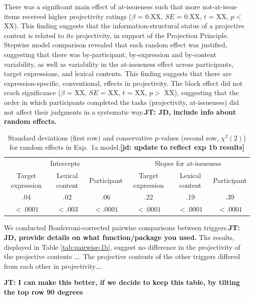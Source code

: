 \documentclass[11pt,fleqn]{article}
\newcommand{\6}{\mbox{$[\hspace*{-.6mm}[$}}
\newcommand{\9}{\mbox{$]\hspace*{-.6mm}]$}}
\newcommand{\tableref}[1]{Table \ref{#1}}
\newcommand{\jt}[1]{\textbf{\color{blue}JT: #1}}
\newcommand{\jd}[1]{\textbf{\color{Green}[jd: #1]}}
\begin{document}
There was a significant main effect of at-issueness such that more not-at-issue items received higher projectivity ratings ($\beta$ = 0.XX, $SE$ = 0.XX, $t$ = XX, $p <$ XX). This finding suggests that the information-structural status of a projective content is related to its projectivity, in support of the Projection Principle. 
Stepwise model comparison revealed that each random effect was justified, suggesting that there was by-participant, by-expression and by-content variability, as well as variability in the at-issueness effect across participants, target expressions, and lexical contents. This finding suggests that there are expression-specific, conventional, effects in projectivity. The block effect did not reach significance ($\beta$ = XX, $SE$ = XX, $t$ = XX, $p >$ XX), suggesting that the order in which participants completed the tasks (projectivity, at-issueness) did not affect their judgments in a systematic way.\jt{JD, include info about random effects.}

\begin{table}
\caption{Standard deviations (first row) and conservative p-values (second row, $\chi^2(2)$) for random effects in Exp.~1a model.\jd{update to reflect exp 1b results}}
\begin{tabular}{c c c c c c }
\toprule
\multicolumn{3}{c}{Intercepts} & \multicolumn{3}{c}{Slopes for at-issueness}\\
Target expression & Lexical content & Participant & Target expression & Lexical content & Participant\\
\midrule
.04 & .02 & .06 & .22 & .19 & .39\\
$< .0001$ & $< .003$ & $< .0001$ & $< .0001$ & $< .0001$ & $< .0001$ \\
\bottomrule
\end{tabular}
\label{tab:random1a}
\end{table}


We conducted Bonferroni-corrected pairwise comparisons between triggers.\jt{JD, provide details on what function/package you used.} The results, displayed in \tableref{tab:pairwise-1b}, suggest no difference in the projectivity of the projective contents \ldots. The projective contents of the other triggers differed from each other in projectivity\ldots. 

\jt{I can make this better, if we decide to keep this table, by tilting the top row 90 degrees}
\end{document}
